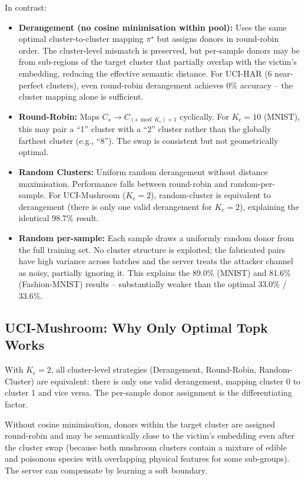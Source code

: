 \documentclass{article}
\begin{document}
In contrast:
\begin{itemize}
\item \textbf{Derangement (no cosine minimisation within pool):}
  Uses the same optimal cluster-to-cluster mapping $\pi^\star$ but assigns
  donors in round-robin order.
  The cluster-level mismatch is preserved, but per-sample donors may be
  from sub-regions of the target cluster that partially overlap with the
  victim's embedding, reducing the effective semantic distance.
  For UCI-HAR (6 near-perfect clusters), even round-robin derangement
  achieves 0\% accuracy -- the cluster mapping alone is sufficient.

\item \textbf{Round-Robin:}
  Maps $C_s \to C_{(s \bmod K_c) + 1}$ cyclically.
  For $K_c = 10$ (MNIST), this may pair a ``1'' cluster with a ``2''
  cluster rather than the globally farthest cluster (e.g., ``8'').
  The swap is consistent but not geometrically optimal.

\item \textbf{Random Clusters:}
  Uniform random derangement without distance maximisation.
  Performance falls between round-robin and random-per-sample.
  For UCI-Mushroom ($K_c\!=\!2$), random-cluster is equivalent to
  derangement (there is only one valid derangement for $K_c\!=\!2$),
  explaining the identical 98.7\% result.

\item \textbf{Random per-sample:}
  Each sample draws a uniformly random donor from the full training set.
  No cluster structure is exploited; the fabricated pairs have high variance
  across batches and the server treats the attacker channel as noisy,
  partially ignoring it.
  This explains the 89.0\% (MNIST) and 81.6\% (Fashion-MNIST) results --
  substantially weaker than the optimal 33.0\% / 33.6\%.
\end{itemize}

\subsection{UCI-Mushroom: Why Only Optimal Topk Works}

With $K_c\!=\!2$, all cluster-level strategies (Derangement, Round-Robin,
Random-Cluster) are equivalent: there is only one valid derangement,
mapping cluster 0 to cluster 1 and vice versa.
The per-sample donor assignment is the differentiating factor.

Without cosine minimisation, donors within the target cluster are assigned
round-robin and may be semantically close to the victim's embedding even
after the cluster swap (because both mushroom clusters contain a mixture
of edible and poisonous species with overlapping physical features for
some sub-groups).
The server can compensate by learning a soft boundary.
\end{document}
